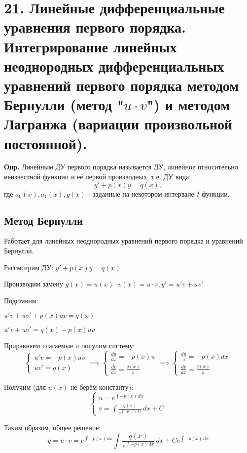 \documentclass[11pt]{article}
\begin{document}
\section*{21. Линейные дифференциальные уравнения первого порядка. Интегрирование линейных неоднородных дифференциальных уравнений первого порядка методом Бернулли (метод "$u \cdot v$") и методом Лагранжа (вариации произвольной постоянной).}
\par\textbf{Опр.} Линейным ДУ первого порядка называется ДУ, линейное относительно неизвестной функции и её первой производных, т.е. ДУ вида:$$y' + p(x)y = q(x),$$где $a_{0}(x), a_{1}(x), g(x)$ - заданные на некотором интервале $I$ функции.
\subsection*{Метод Бернулли}
\par Работает для линейных неоднородных уравнений первого порядка и уравнений Бернулли.
\par Рассмотрим ДУ: $y' + p(x)y = q(x)$
\par Производим замену $y(x) = u(x) \cdot v(x) = u \cdot v, y' = u'v + uv'$
\par Подставим:
\par $u'v + uv' + p(x)uv = q(x)$
\par $u'v + uv' = q(x) - p(x)uv$
\par Приравняем слагаемые и получим систему: $$\left\{\begin{array}{l}
u'v = -p(x)uv \\
uv' = q(x)
\end{array}\right. \implies
\left\{\begin{array}{l}
\frac{du}{dx} = -p(x)u \\
\frac{dv}{dx} = \frac{q(x)}{u}
\end{array}\right. \implies
\left\{\begin{array}{l}
\frac{du}{u} = -p(x)dx \\
\frac{dv}{dx} = \frac{q(x)}{u}
\end{array}\right.$$
\par Получим (для $u(x)$ не берём константу): $$\left\{\begin{array}{l}
u = e^{\int -p(x) \, dx}  \\
v = \int \frac{q(x)}{e^{\int -p(x) \, dx}} \, dx + C
\end{array}\right.$$
\par Таким образом, общее решение: $$y = u \cdot v = e^{\int -p(x) \, dx}\int \frac{q(x)}{e^{\int -p(x) \, dx}} \, dx + C e^{\int -p(x) \, dx}$$
\end{document}
